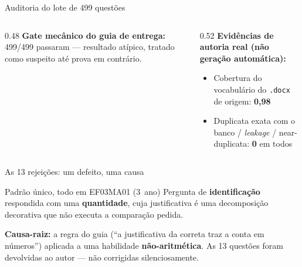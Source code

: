 \documentclass[aspectratio=169,11pt]{beamer}
\begin{document}
\begin{frame}{Auditoria do lote de 499 questões}
  \begin{columns}[T]
    \begin{column}{0.48\textwidth}
      \small
      \textbf{Gate mecânico do guia de entrega:} 499/499 passaram —
      resultado atípico, tratado como suspeito até prova em contrário.
    \end{column}
    \begin{column}{0.52\textwidth}
      \small
      \textbf{Evidências de autoria real (não geração automática):}
      \begin{itemize}
        \item Cobertura do vocabulário do \texttt{.docx} de origem: \textbf{0,98}
        \item Duplicata exata com o banco / \emph{leakage} / near-duplicata: \textbf{0} em todos
      \end{itemize}
    \end{column}
  \end{columns}
\end{frame}

\begin{frame}{As 13 rejeições: um defeito, uma causa}
  \begin{alertblock}{Padrão único, todo em EF03MA01 (3\textordmasculine\ ano)}
    Pergunta de \textbf{identificação} respondida com uma \textbf{quantidade}, cuja
    justificativa é uma decomposição decorativa que não executa a comparação pedida.
  \end{alertblock}
  \begin{center}
  \end{center}
  \textbf{Causa-raiz:} a regra do guia (``a justificativa da correta traz a
  conta em números'') aplicada a uma habilidade \textbf{não-aritmética}.
  As 13 questões foram devolvidas ao autor — não corrigidas silenciosamente.
\end{frame}
\end{document}
